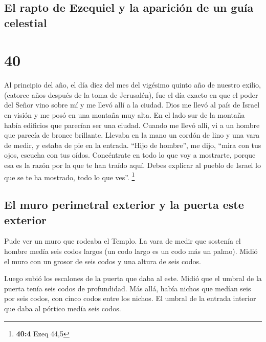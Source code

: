 \hypertarget{el-rapto-de-ezequiel-y-la-apariciuxf3n-de-un-guuxeda-celestial}{%
\subsection{El rapto de Ezequiel y la aparición de un guía
celestial}\label{el-rapto-de-ezequiel-y-la-apariciuxf3n-de-un-guuxeda-celestial}}

\hypertarget{section-39}{%
\section{40}\label{section-39}}

 Al principio del año, el día diez del mes del vigésimo
quinto año de nuestro exilio, (catorce años después de la toma de
Jerusalén), fue el día exacto en que el poder del Señor vino sobre mí y
me llevó allí a la ciudad.  Dios me llevó al país de
Israel en visión y me posó en una montaña muy alta. En el lado sur de la
montaña había edificios que parecían ser una ciudad. 
Cuando me llevó allí, vi a un hombre que parecía de bronce brillante.
Llevaba en la mano un cordón de lino y una vara de medir, y estaba de
pie en la entrada.  ``Hijo de hombre'', me dijo, ``mira
con tus ojos, escucha con tus oídos. Concéntrate en todo lo que voy a
mostrarte, porque esa es la razón por la que te han traído aquí. Debes
explicar al pueblo de Israel lo que se te ha mostrado, todo lo que
ves''. \footnote{\textbf{40:4} Ezeq 44,5}

\hypertarget{el-muro-perimetral-exterior-y-la-puerta-este-exterior}{%
\subsection{El muro perimetral exterior y la puerta este
exterior}\label{el-muro-perimetral-exterior-y-la-puerta-este-exterior}}

 Pude ver un muro que rodeaba el Templo. La vara de medir
que sostenía el hombre medía seis codos largos (un codo largo es un codo
más un palmo). Midió el muro con un grosor de seis codos y una altura de
seis codos.

 Luego subió los escalones de la puerta que daba al este.
Midió que el umbral de la puerta tenía seis codos de profundidad.
 Más allá, había nichos que medían seis por seis codos,
con cinco codos entre los nichos. El umbral de la entrada interior que
daba al pórtico medía seis codos.

